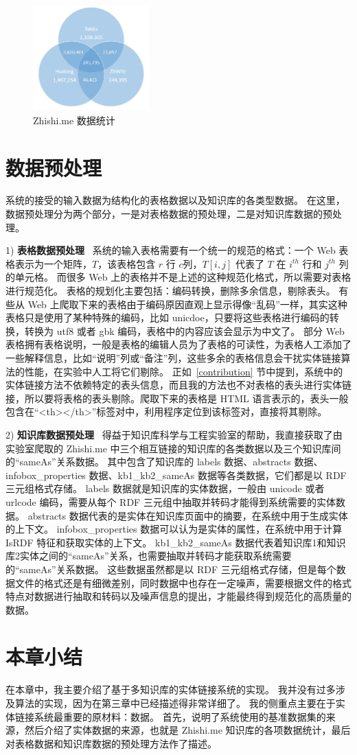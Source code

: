 \begin{figure}[htbp]
\centering
\includegraphics[width=0.4\textwidth]{img/zhishime_data}
\caption{Zhishi.me 数据统计}
\label{zhishime_data}
\end{figure}


\section{数据预处理}
系统的接受的输入数据为结构化的表格数据以及知识库的各类型数据。
在这里，数据预处理分为两个部分，一是对表格数据的预处理，二是对知识库数据的预处理。

1) \textbf{表格数据预处理} \ 
系统的输入表格需要有一个统一的规范的格式：一个 Web 表格表示为一个矩阵，$T$，该表格包含 $r$ 行 $c$列，$T[i,j]$ 代表了 $T$ 在 $i^{th}$ 行和 $j^{th}$ 列的单元格。
而很多 Web 上的表格并不是上述的这种规范化格式，所以需要对表格进行规范化。
表格的规划化主要包括：编码转换，删除多余信息，剔除表头。
有些从 Web 上爬取下来的表格由于编码原因直观上显示得像``乱码''一样，其实这种表格只是使用了某种特殊的编码，比如 unicdoe，只要将这些表格进行编码的转换，转换为 utf8 或者 gbk 编码，表格中的内容应该会显示为中文了。
部分 Web 表格拥有表格说明，一般是表格的编辑人员为了表格的可读性，为表格人工添加了一些解释信息，比如``说明''列或``备注''列，这些多余的表格信息会干扰实体链接算法的性能，在实验中人工将它们剔除。
正如~\ref{contribution} 节中提到，系统中的实体链接方法不依赖特定的表头信息，而且我的方法也不对表格的表头进行实体链接，所以要将表格的表头剔除。爬取下来的表格是 HTML 语言表示的，表头一般包含在``<th></th>''标签对中，利用程序定位到该标签对，直接将其剔除。

2) \textbf{知识库数据预处理} \ 
得益于知识库科学与工程实验室的帮助，我直接获取了由实验室爬取的 Zhishi.me 中三个相互链接的知识库的各类数据以及三个知识库间的``sameAs''关系数据。
其中包含了知识库的 labels 数据、abstracts 数据、infobox\_properties 数据、kb1\_kb2\_sameAs 数据等各类数据，它们都是以 RDF 三元组格式存储。
labels 数据就是知识库的实体数据，一般由 unicode 或者 urlcode 编码，需要从每个 RDF 三元组中抽取并转码才能得到系统需要的实体数据。
abstracts 数据代表的是实体在知识库页面中的摘要，在系统中用于生成实体的上下文。
infobox\_properties 数据可以认为是实体的属性，在系统中用于计算 IsRDF 特征和获取实体的上下文。
kb1\_kb2\_sameAs 数据代表着知识库1和知识库2实体之间的``sameAs''关系，也需要抽取并转码才能获取系统需要的``sameAs''关系数据。
这些数据虽然都是以 RDF 三元组格式存储，但是每个数据文件的格式还是有细微差别，同时数据中也存在一定噪声，需要根据文件的格式特点对数据进行抽取和转码以及噪声信息的提出，才能最终得到规范化的高质量的数据。


\section{本章小结}
在本章中，我主要介绍了基于多知识库的实体链接系统的实现。
我并没有过多涉及算法的实现，因为在第三章中已经描述得非常详细了。
我的侧重点主要在于实体链接系统最重要的原材料：数据。
首先，说明了系统使用的基准数据集的来源，然后介绍了实体数据的来源，也就是 Zhishi.me 知识库的各项数据统计，最后对表格数据和知识库数据的预处理方法作了描述。